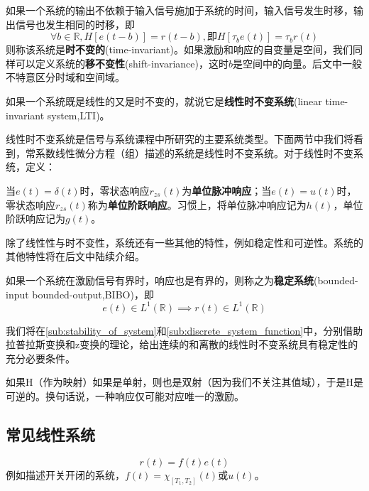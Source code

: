 \begin{definition}[时不变性和移不变性]
    如果一个系统的输出不依赖于输入信号施加于系统的时间，输入信号发生时移，输出信号也发生相同的时移，即
    $$\forall b\in\mathbb{R},H[e(t-b)]=r(t-b),\text{即}H[\tau_b e(t)]=\tau_b r(t)$$
    则称该系统是\textbf{时不变的}(time-invariant)。如果激励和响应的自变量是空间，我们同样可以定义系统的\textbf{移不变性}(shift-invariance)，这时$b$是空间中的向量。后文中一般不特意区分时域和空间域。
\end{definition}
\begin{definition}[线性时不变系统]
    如果一个系统既是线性的又是时不变的，就说它是\textbf{线性时不变系统}(linear time-invariant system,LTI)。
\end{definition}

线性时不变系统是信号与系统课程中所研究的主要系统类型。下面两节中我们将看到，常系数线性微分方程（组）描述的系统是线性时不变系统。对于线性时不变系统，定义：

\begin{definition}[单位脉冲响应与单位阶跃响应]
    当$e(t)=\delta(t)$时，零状态响应$r_{zs}(t)$为\textbf{单位脉冲响应}；当$e(t)=u(t)$时，零状态响应$r_{zs}(t)$称为\textbf{单位阶跃响应}。习惯上，将单位脉冲响应记为$h(t)$，单位阶跃响应记为$g(t)$。
\end{definition}

除了线性性与时不变性，系统还有一些其他的特性，例如稳定性和可逆性。系统的其他特性将在后文中陆续介绍。

\begin{definition}[稳定性]
如果一个系统在激励信号有界时，响应也是有界的，则称之为\textbf{稳定系统}(bounded-input bounded-output,BIBO)，即
\[e(t)\in L^1(\mathbb{R})\implies r(t)\in L^1(\mathbb{R})\]
\end{definition}
我们将在\ref{sub:stability_of_system}和\ref{sub:discrete_system_function}中，分别借助拉普拉斯变换和z变换的理论，给出连续的和离散的线性时不变系统具有稳定性的充分必要条件。

\begin{definition}[可逆性]
    如果H（作为映射）如果是单射，则也是双射（因为我们不关注其值域），于是H是可逆的。换句话说，一种响应仅可能对应唯一的激励。
\end{definition}

\subsection{常见线性系统}\label{sub:ordinary_system}

\begin{example}[时域乘积]
\begin{equation*}
    r(t)=f(t)e(t)
\end{equation*}
例如描述开关开闭的系统，$f(t)=\chi_{[T_1,T_2]}(t)$或$u(t)$。
\end{example}

